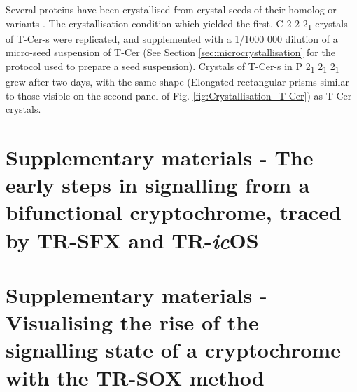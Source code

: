 Several proteins have been crystallised from crystal seeds of their homolog or variants \parencite{bergforsSeedsCrystals2003}. The crystallisation condition which yielded the first, C 2 2 2\textsubscript{1} crystals of T-Cer-s were replicated, and supplemented with a 1/1000 000 dilution of a micro-seed suspension of T-Cer (See Section \ref{sec:microcrystallisation} for the protocol used to prepare a seed suspension).  Crystals of T-Cer-s in P 2\textsubscript{1} 2\textsubscript{1} 2\textsubscript{1} grew after two days, with the same shape (Elongated rectangular prisms similar to those visible on the second panel of Fig. \ref{fig:Crystallisation_T-Cer}) as T-Cer crystals. 


\section{Supplementary materials - The early steps in signalling from a bifunctional cryptochrome, traced by TR-SFX and TR-\textit{ic}OS}\label{sup:CraCRY_TR-SFX_1_sup}
\section{Supplementary materials - Visualising the rise of the signalling state of a cryptochrome with the TR-SOX method}




